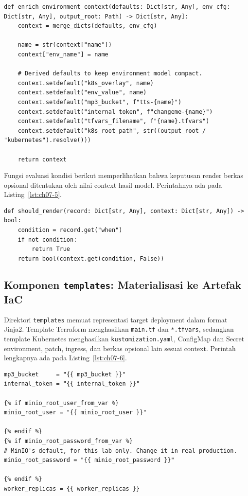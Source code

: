 \begin{lstlisting}[style=PythonStyle,caption={Listing: Cuplikan fungsi pembentuk context (mde/transformers/generate.py)}, label={lst:ch07-4}]
def enrich_environment_context(defaults: Dict[str, Any], env_cfg: Dict[str, Any], output_root: Path) -> Dict[str, Any]:
    context = merge_dicts(defaults, env_cfg)

    name = str(context["name"])
    context["env_name"] = name

    # Derived defaults to keep environment model compact.
    context.setdefault("k8s_overlay", name)
    context.setdefault("env_value", name)
    context.setdefault("mp3_bucket", f"tts-{name}")
    context.setdefault("internal_token", f"changeme-{name}")
    context.setdefault("tfvars_filename", f"{name}.tfvars")
    context.setdefault("k8s_root_path", str((output_root / "kubernetes").resolve()))

    return context
\end{lstlisting}

Fungsi evaluasi kondisi berikut memperlihatkan bahwa keputusan render berkas opsional ditentukan oleh nilai context hasil model. Perintahnya ada pada Listing~\ref{lst:ch07-5}.

\begin{lstlisting}[style=PythonStyle,caption={Listing: Cuplikan evaluasi kondisi file opsional (mde/transformers/generate.py)}, label={lst:ch07-5}]
def should_render(record: Dict[str, Any], context: Dict[str, Any]) -> bool:
    condition = record.get("when")
    if not condition:
        return True
    return bool(context.get(condition, False))
\end{lstlisting}

\subsection[Komponen templates]{Komponen \texttt{templates}: Materialisasi ke Artefak IaC}\label{subsec:mde-templates}

Direktori \texttt{templates} memuat representasi target deployment dalam format Jinja2. Template Terraform menghasilkan \texttt{main.tf} dan \texttt{*.tfvars}, sedangkan template Kubernetes menghasilkan \texttt{kustomization.yaml}, ConfigMap dan Secret environment, patch, ingress, dan berkas opsional lain sesuai context. Perintah lengkapnya ada pada Listing~\ref{lst:ch07-6}.

\begin{lstlisting}[style=PythonStyle,caption={Listing: Cuplikan template tfvars (mde/templates/terraform/env/tfvars.j2)}, label={lst:ch07-6}]
mp3_bucket     = "{{ mp3_bucket }}"
internal_token = "{{ internal_token }}"

{% if minio_root_user_from_var %}
minio_root_user = "{{ minio_root_user }}"

{% endif %}
{% if minio_root_password_from_var %}
# MinIO's default, for this lab only. Change it in real production.
minio_root_password = "{{ minio_root_password }}"

{% endif %}
worker_replicas = {{ worker_replicas }}
\end{lstlisting}


